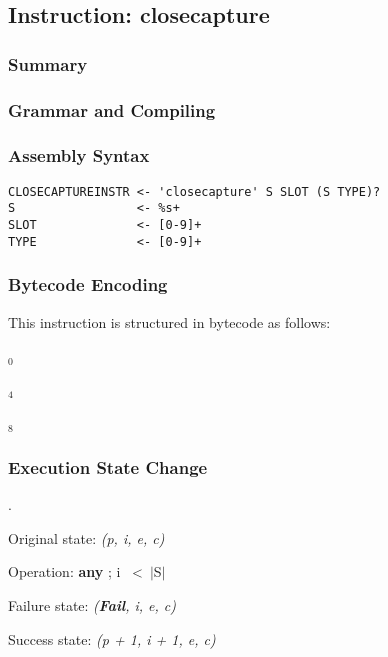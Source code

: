 \subsection{Instruction: closecapture}

\subsubsection{Summary}

\subsubsection{Grammar and Compiling}

\subsubsection{Assembly Syntax}

\begin{myquote}
\begin{verbatim}
CLOSECAPTUREINSTR <- 'closecapture' S SLOT (S TYPE)?
S                 <- %s+
SLOT              <- [0-9]+
TYPE              <- [0-9]+

\end{verbatim}
\end{myquote}

\subsubsection{Bytecode Encoding}

This instruction is structured in bytecode as follows:

$_0$\ 


$_4$\

$_8$\
\fbox{%
  \parbox{20pt}{%
mm
  }%
}

\subsubsection{Execution State Change}

.

Original state: \textit{(p, i, e, c)}

Operation: \textbf{any} ; i \ \textless \ $\vert$S$\vert$

Failure state: \textit{(\textbf{Fail}, i, e, c)}

Success state: \textit{(p + 1, i + 1, e, c)}

